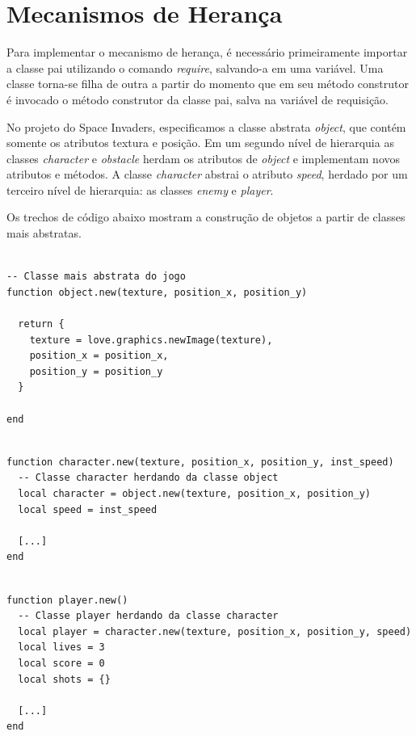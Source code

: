 \documentclass[rel_mlp]{iiufrgs}
\begin{document}
\section{Mecanismos de Herança} \label{Herança}

Para implementar o mecanismo de herança, é necessário primeiramente importar a classe pai utilizando o comando \textit{require}, salvando-a em uma variável. Uma classe torna-se filha de outra a partir do momento que em seu método construtor é invocado o método construtor da classe pai, salva na variável de requisição. 

No projeto do Space Invaders, especificamos a classe abstrata \textit{object}, que contém somente os atributos textura e posição. Em um segundo nível de hierarquia as classes \textit{character} e \textit{obstacle} herdam os atributos de \textit{object} e implementam novos atributos e métodos. A classe \textit{character} abstrai o atributo \textit{speed}, herdado por um terceiro nível de hierarquia: as classes \textit{enemy} e \textit{player}.

Os trechos de código abaixo mostram a construção de objetos a partir de classes mais abstratas.

\begin{lstlisting}

-- Classe mais abstrata do jogo
function object.new(texture, position_x, position_y)

  return {
    texture = love.graphics.newImage(texture),
    position_x = position_x,
    position_y = position_y
  }

end

\end{lstlisting}

\begin{lstlisting}

function character.new(texture, position_x, position_y, inst_speed)
  -- Classe character herdando da classe object
  local character = object.new(texture, position_x, position_y)
  local speed = inst_speed
  
  [...]
end

\end{lstlisting}

\begin{lstlisting}

function player.new()
  -- Classe player herdando da classe character
  local player = character.new(texture, position_x, position_y, speed)
  local lives = 3
  local score = 0
  local shots = {}
  
  [...]
end

\end{lstlisting}
\end{document}
